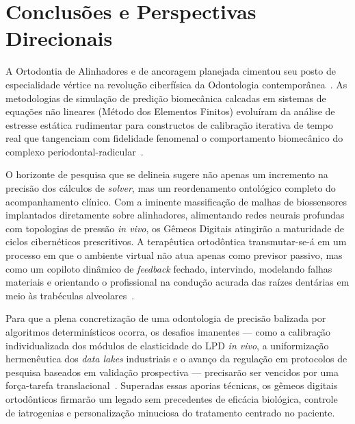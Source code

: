 \section{Conclusões e Perspectivas Direcionais}

A Ortodontia de Alinhadores e de ancoragem planejada cimentou seu posto de especialidade vértice na revolução ciberfísica da Odontologia contemporânea~\cite{olawade2026advancing, duggal2026exploring}. As metodologias de simulação de predição biomecânica calcadas em sistemas de equações não lineares (Método dos Elementos Finitos) evoluíram da análise de estresse estática rudimentar para constructos de calibração iterativa de tempo real que tangenciam com fidelidade fenomenal o comportamento biomecânico do complexo periodontal-radicular~\cite{zhang2024recursive}.

O horizonte de pesquisa que se delineia sugere não apenas um incremento na precisão dos cálculos de \textit{solver}, mas um reordenamento ontológico completo do acompanhamento clínico. Com a iminente massificação de malhas de biossensores implantados diretamente sobre alinhadores, alimentando redes neurais profundas com topologias de pressão \textit{in vivo}, os Gêmeos Digitais atingirão a maturidade de ciclos cibernéticos prescritivos. A terapêutica ortodôntica transmutar-se-á em um processo em que o ambiente virtual não atua apenas como previsor passivo, mas como um copiloto dinâmico de \textit{feedback} fechado, intervindo, modelando falhas materiais e orientando o profissional na condução acurada das raízes dentárias em meio às trabéculas alveolares~\cite{khoshfekr2025digital}.

Para que a plena concretização de uma odontologia de precisão balizada por algoritmos determinísticos ocorra, os desafios imanentes — como a calibração individualizada dos módulos de elasticidade do LPD \textit{in vivo}, a uniformização hermenêutica dos \textit{data lakes} industriais e o avanço da regulação em protocolos de pesquisa baseados em validação prospectiva — precisarão ser vencidos por uma força-tarefa translacional~\cite{techsoc2025precision}. Superadas essas aporias técnicas, os gêmeos digitais ortodônticos firmarão um legado sem precedentes de eficácia biológica, controle de iatrogenias e personalização minuciosa do tratamento centrado no paciente.
